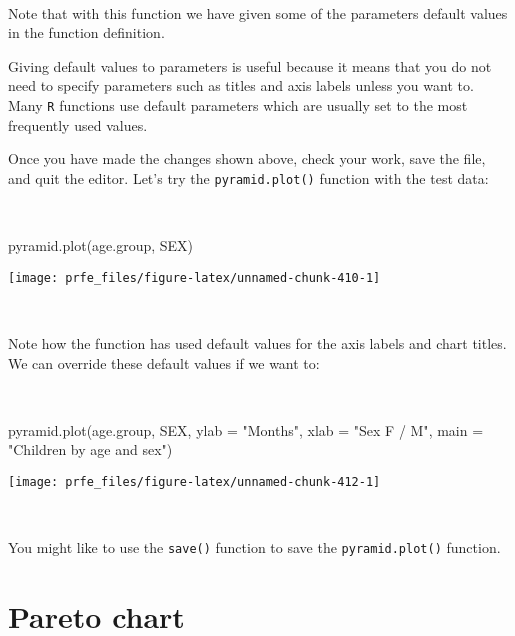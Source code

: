 \documentclass[
  12pt,
  a4paper]{book}
\newenvironment{Shaded}{\begin{snugshade}}{\end{snugshade}}
\newcommand{\AttributeTok}[1]{\textcolor[rgb]{0.77,0.63,0.00}{#1}}
\newcommand{\FunctionTok}[1]{\textcolor[rgb]{0.00,0.00,0.00}{#1}}
\newcommand{\NormalTok}[1]{#1}
\newcommand{\StringTok}[1]{\textcolor[rgb]{0.31,0.60,0.02}{#1}}
\begin{document}
~

Note that with this function we have given some of the parameters default values in the function definition.

Giving default values to parameters is useful because it means that you do not need to specify parameters such as titles and axis labels unless you want to. Many \texttt{R} functions use default parameters which are usually set to the most frequently used values.

Once you have made the changes shown above, check your work, save the file, and quit the editor. Let's try the \texttt{pyramid.plot()} function with the test data:

~

\begin{Shaded}
\begin{Highlighting}[]
\FunctionTok{pyramid.plot}\NormalTok{(age.group, SEX)}
\end{Highlighting}
\end{Shaded}

\begin{center}\texttt{[image: prfe\_files/figure-latex/unnamed-chunk-410-1]} \end{center}

~

Note how the function has used default values for the axis labels and chart titles. We can override these default values if we want to:

~

\begin{Shaded}
\begin{Highlighting}[]
\FunctionTok{pyramid.plot}\NormalTok{(age.group, SEX, }\AttributeTok{ylab =} \StringTok{"Months"}\NormalTok{, }\AttributeTok{xlab =} \StringTok{"Sex F / M"}\NormalTok{,}
             \AttributeTok{main =} \StringTok{"Children by age and sex"}\NormalTok{)}
\end{Highlighting}
\end{Shaded}

\newpage

\begin{center}\texttt{[image: prfe\_files/figure-latex/unnamed-chunk-412-1]} \end{center}

~

You might like to use the \texttt{save()} function to save the \texttt{pyramid.plot()} function.

\hypertarget{pareto-chart}{%
\section{Pareto chart}\label{pareto-chart}}
\end{document}
